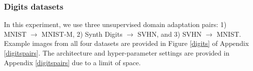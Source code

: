 \documentclass{article}
\begin{document}
\begin{table}[t]
{}
\parbox[t]{.49\linewidth}{
\centering 
\caption{Mean classification accuracy (\%) of different unsupervised domain adaptation approaches for the office dataset. We have cited the original results (if applicable) and in
parentheses we show the results reported in~\cite{chen2020adversarial} with data augmentation.}

\label{office}

}
\vspace{-2mm}
\end{table}

\subsubsection{Digits datasets}
 In this experiment, we use three unsupervised domain adaptation pairs: 1) MNIST $\rightarrow$ MNIST-M, 2) Synth Digits $\rightarrow$ SVHN, and 3) SVHN $\rightarrow$ MNIST. Example images from all four datasets are provided in Figure \ref{digits} of Appendix \ref{digitspairs}.  The architecture and hyper-parameter settings are provided in Appendix \ref{digitspairs} due to a limit of space. 
\end{document}
